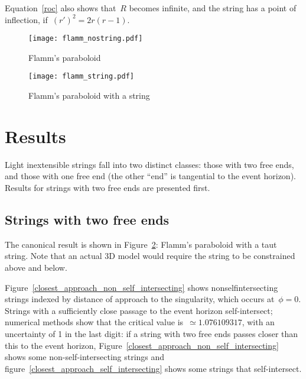 \documentclass[prb,preprint]{revtex4-1}
\begin{document}
% 
% 
% 

Equation~\ref{roc} also shows that~$R$ becomes infinite, and the
string has a point of inflection,
if~$\left(r'\right)^2=2r\left(r-1\right)$.

\begin{figure}[h!]
\centering
\texttt{[image: flamm\_nostring.pdf]}
\caption{Flamm's paraboloid}
\label{flamm_nostring}
\end{figure}

\begin{figure}[h!]
\centering
\texttt{[image: flamm\_string.pdf]}
\caption{Flamm's paraboloid with a string}
\label{flamm_withstring}
\end{figure}

\section{Results}
Light inextensible strings fall into two distinct classes: those with
two free ends, and those with one free end (the other ``end'' is
tangential to the event horizon).  Results for strings with two free
ends are presented first.


\subsection{Strings with two free ends}

The canonical result is shown in Figure~\ref{flamm_withstring}:
Flamm's paraboloid with a taut string.  Note that an actual 3D model
would require the string to be constrained above and below.

Figure~\ref{closest_approach_non_self_intersecting} shows
nonselfintersecting strings indexed by distance of approach to the
singularity, which occurs at~$\phi=0$.  Strings with a sufficiently
close passage to the event horizon self-intersect; numerical methods
show that the critical value is~$\simeq 1.076109317$, with an
uncertainty of 1 in the last digit: if a string with two free ends
passes closer than this to the event horizon,
Figure~\ref{closest_approach_non_self_intersecting} shows some
non-self-intersecting strings and
figure~\ref{closest_approach_self_intersecting} shows some strings
that self-intersect.
\end{document}

